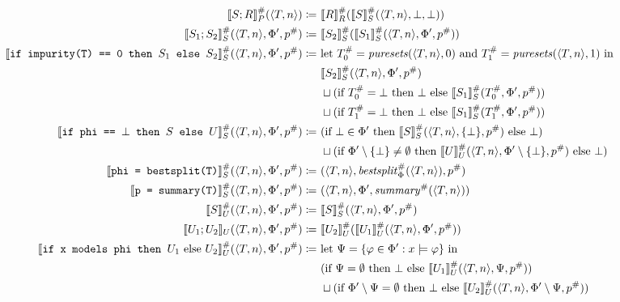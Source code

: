 \begin{figure}
\centering
\newcommand{\argtuple}{\langle T, n \rangle, \Phi', p^\#}
\begin{align*}
\den[P]{S ; R}^\#(\langle T, n \rangle) \coloneqq&~
\den[R]{R}^\#(\den[S]{S}^\#(\langle T, n \rangle, \bot, \bot)) \\
%
\den[S]{S_1 ; S_2}^\#(\argtuple) \coloneqq&~
\den[S]{S_2}^\#(\den[S]{S_1}^\#(\argtuple)) \\
%
\den[S]{\iteimpuritynode{S_1}{S_2}}^\#(\argtuple) \coloneqq&~
\text{let } T_0^\# = \mathit{puresets}(\langle T, n \rangle, 0) \text{ and }
T_1^\# = \mathit{puresets}(\langle T, n \rangle, 1) \text{ in } \\
&~\den[S]{S_2}^\#(\langle T, n \rangle, \Phi', p^\#) \\
&~\sqcup
(\text{if } T_0^\# = \bot \text{ then } \bot \text{ else } \den[S]{S_1}^\#(T_0^\#, \Phi', p^\#)) \\
&~\sqcup
(\text{if } T_1^\# = \bot \text{ then } \bot \text{ else } \den[S]{S_1}^\#(T_1^\#, \Phi', p^\#)) \\
%
\den[S]{\itetrivialnode{S}{U}}^\#(\argtuple) \coloneqq&~
(\text{if } \bot \in \Phi' \text{ then } \den[S]{S}^\#(\langle T, n \rangle, \{\bot\}, p^\#) \text{ else } \bot) \\
&~\sqcup
(\text{if } \Phi' \setminus \{\bot\} \neq \emptyset \text{ then }
\den[U]{U}^\#(\langle T, n \rangle, \Phi' \setminus \{\bot\}, p^\#) \text{ else } \bot)\\
%
\den[S]{\bestsplitnode}^\#(\argtuple)
\coloneqq&~ (\langle T, n \rangle, \mathit{bestsplit}_\Phi^\#(\langle T, n \rangle), p^\#) \\
%
\den[S]{\summarynode}^\#(\argtuple) \coloneqq&~
(\langle T, n \rangle, \Phi', \mathit{summary}^\#(\langle T, n \rangle)) \\
%
\den[U]{S}^\#(\argtuple) \coloneqq&~
\den[S]{S}^\#(\argtuple) \\
%
\den[U]{U_1 ; U_2}(\argtuple) \coloneqq&~
\den[U]{U_2}^\#(\den[U]{U_1}^\#(\argtuple)) \\
%
\den[U]{\itemodelsnode{U_1}{U_2}}^\#(\argtuple) \coloneqq&~
\text{let } \Psi = \{\varphi \in \Phi' : x \models \varphi\} \text{ in } \\
&~(\text{if } \Psi = \emptyset \text{ then } \bot \text{ else }
\den[U]{U_1}^\#(\langle T, n \rangle, \Psi, p^\#)) \\
&~\sqcup
(\text{if } \Phi' \setminus \Psi = \emptyset \text{ then } \bot \text{ else }
\den[U]{U_2}^\#(\langle T, n \rangle, \Phi' \setminus \Psi, p^\#)) \\

\end{align*}
\end{figure}
